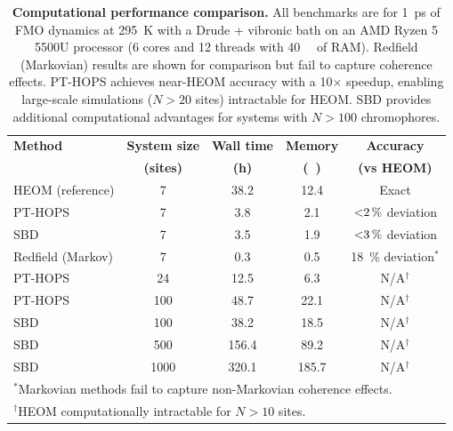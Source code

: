 \documentclass[11pt,a4paper]{article}
\begin{document}
\begin{table}[ht]
\centering
\caption{\textbf{Computational performance comparison.} All benchmarks are for \SI{1}{\pico\second} of FMO dynamics at \SI{295}{\kelvin} with a Drude + vibronic bath on an AMD Ryzen 5 5500U processor (6 cores and 12 threads with \SI{40}{\giga\byte} of RAM). Redfield (Markovian) results are shown for comparison but fail to capture coherence effects. PT-HOPS achieves near-HEOM accuracy with a \num{10}$\times$ speedup, enabling large-scale simulations ($N > 20$ sites) intractable for HEOM. SBD provides additional computational advantages for systems with $N > 100$ chromophores.}
\label{tab:computational_benchmarks}
\begin{tabular}{lcccc}
	\toprule
	\textbf{Method}   & \textbf{System size} &  \textbf{Wall time}   &      \textbf{Memory}       &         \textbf{Accuracy}         \\
	                  &   \textbf{(sites)}   & \textbf{(\si{\hour})} & \textbf{(\si{\giga\byte})} &        \textbf{(vs HEOM)}         \\ \midrule
	HEOM (reference)  &          7           &         38.2          &            12.4            &               Exact               \\
	PT-HOPS           &          7           &          3.8          &            2.1             & $\SI{<2}{\percent}$ deviation \\
	SBD               &          7           &          3.5          &            1.9             & $\SI{<3}{\percent}$ deviation \\
	Redfield (Markov) &          7           &          0.3          &            0.5             &  \SI{18}{\percent} deviation$^*$  \\ \midrule
	PT-HOPS           &          24          &         12.5          &            6.3             &           N/A$^\dagger$           \\
	PT-HOPS           &         100          &         48.7          &            22.1            &           N/A$^\dagger$           \\
	SBD               &         100          &         38.2          &            18.5            &           N/A$^\dagger$           \\
	SBD               &         500          &         156.4         &            89.2            &           N/A$^\dagger$           \\
	SBD               &         1000         &         320.1         &           185.7            &           N/A$^\dagger$           \\ \bottomrule
	\multicolumn{5}{l}{\scriptsize $^*$Markovian methods fail to capture non-Markovian coherence effects.}                            \\
	\multicolumn{5}{l}{\scriptsize $^\dagger$HEOM computationally intractable for $N > 10$ sites.}
\end{tabular}
\end{table}
\end{document}
